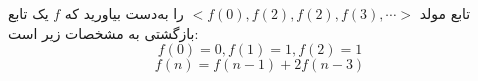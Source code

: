 \EXERCISE
تابع مولد
$<f(0), f(2), f(2), f(3), \cdots>$
را به‌دست بیاورید که
$f$
یک تابع بازگشتی به مشخصات زیر است:
$$f(0) = 0, f(1) = 1, f(2) = 1$$
$$f(n) = f(n - 1) + 2f(n - 3)$$